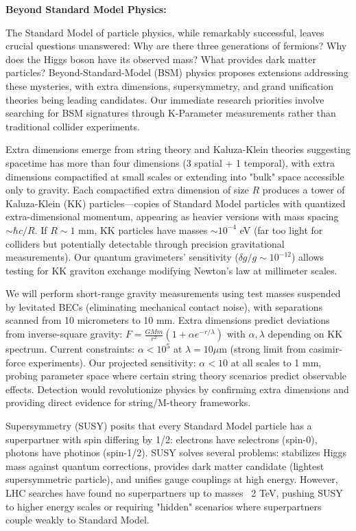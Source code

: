 \documentclass[11pt,a4paper,twoside]{article}
\begin{document}
\textbf{Beyond Standard Model Physics:}

The Standard Model of particle physics, while remarkably successful, leaves crucial questions unanswered: Why are there three generations of fermions? Why does the Higgs boson have its observed mass? What provides dark matter particles? Beyond-Standard-Model (BSM) physics proposes extensions addressing these mysteries, with extra dimensions, supersymmetry, and grand unification theories being leading candidates. Our immediate research priorities involve searching for BSM signatures through K-Parameter measurements rather than traditional collider experiments.

Extra dimensions emerge from string theory and Kaluza-Klein theories suggesting spacetime has more than four dimensions (3 spatial + 1 temporal), with extra dimensions compactified at small scales or extending into "bulk" space accessible only to gravity. Each compactified extra dimension of size $R$ produces a tower of Kaluza-Klein (KK) particles—copies of Standard Model particles with quantized extra-dimensional momentum, appearing as heavier versions with mass spacing $\sim \hbar c/R$. If $R \sim 1$ mm, KK particles have masses $\sim 10^{-4}$ eV (far too light for colliders but potentially detectable through precision gravitational measurements). Our quantum gravimeters' sensitivity ($\delta g/g \sim 10^{-12}$) allows testing for KK graviton exchange modifying Newton's law at millimeter scales.

We will perform short-range gravity measurements using test masses suspended by levitated BECs (eliminating mechanical contact noise), with separations scanned from 10 micrometers to 10 mm. Extra dimensions predict deviations from inverse-square gravity: $F = \frac{GMm}{r^2}(1 + \alpha e^{-r/\lambda})$ with $\alpha, \lambda$ depending on KK spectrum. Current constraints: $\alpha < 10^5$ at $\lambda = 10 \mu$m (strong limit from casimir-force experiments). Our projected sensitivity: $\alpha < 10$ at all scales to 1 mm, probing parameter space where certain string theory scenarios predict observable effects. Detection would revolutionize physics by confirming extra dimensions and providing direct evidence for string/M-theory frameworks.

Supersymmetry (SUSY) posits that every Standard Model particle has a superpartner with spin differing by 1/2: electrons have selectrons (spin-0), photons have photinos (spin-1/2). SUSY solves several problems: stabilizes Higgs mass against quantum corrections, provides dark matter candidate (lightest supersymmetric particle), and unifies gauge couplings at high energy. However, LHC searches have found no superpartners up to masses ~2 TeV, pushing SUSY to higher energy scales or requiring "hidden" scenarios where superpartners couple weakly to Standard Model.
\end{document}
